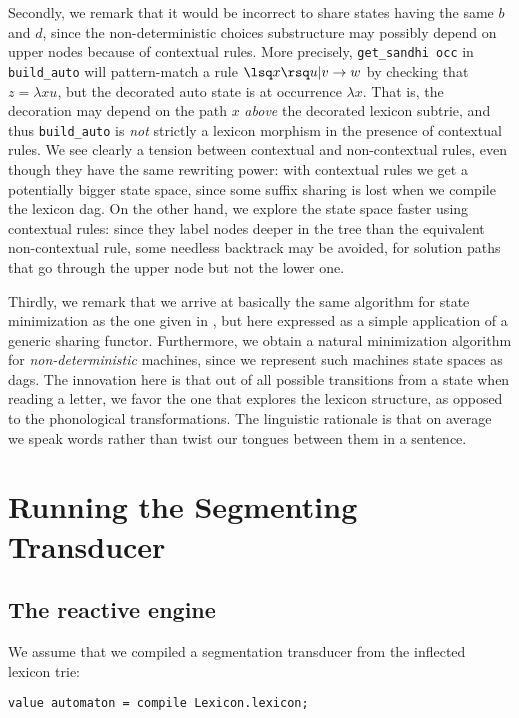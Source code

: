 Secondly, we remark that it would be incorrect to share states having the 
same $b$ and $d$, since the non-deterministic choices substructure
may possibly depend on upper nodes because of contextual rules. 
More precisely, \verb:get_sandhi occ: in  \verb:build_auto: will
pattern-match a rule $\lsq x\rsq u|v\rightarrow w$
by checking that $z=\lambda x u$, but the decorated auto state is
at occurrence $\lambda x$. That is, the decoration may depend on the
path $x$ {\sl above} the decorated lexicon subtrie, and thus \verb:build_auto: 
is {\sl not} strictly a lexicon morphism in the presence of contextual rules.
We see clearly a tension between contextual and non-contextual rules, even
though they have the same rewriting power: with contextual rules we get
a potentially bigger state space, since some suffix sharing is lost when
we compile the lexicon dag. On the other hand, we explore the state space
faster using contextual rules: since they label nodes deeper in the tree than
the equivalent non-contextual rule, 
some needless backtrack may be avoided, for solution paths that go through 
the upper node but not the lower one. 

Thirdly, we remark that we arrive at basically the same algorithm
for state minimization as the one given in \cite{daciuk},
but here expressed as a simple application of a generic sharing functor. 
Furthermore, we obtain a natural minimization algorithm for 
{\sl non-deterministic} machines, since we represent such machines state
spaces as dags. The innovation here is that out of all possible transitions
from a state when reading a letter, we favor the one that explores the
lexicon structure, as opposed to the phonological 
transformations. The linguistic rationale is that on average
we speak words rather than twist our tongues between them in a sentence.

\section{Running the Segmenting Transducer}

\subsection{The reactive engine}

We assume that we compiled a segmentation transducer from the inflected
lexicon trie:
\begin{verbatim}
value automaton = compile Lexicon.lexicon;
\end{verbatim}

